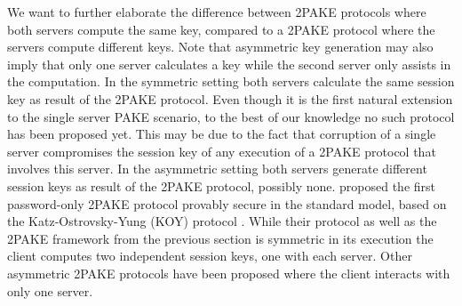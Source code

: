 
We want to further elaborate the difference between \ac{2PAKE} protocols where both servers compute the same key, compared to a \ac{2PAKE} protocol where the servers compute different keys.
Note that asymmetric key generation may also imply that only one server calculates a key while the second server only assists in the computation.
In the symmetric setting both servers calculate the same session key as result of the \ac{2PAKE} protocol.
Even though it is the first natural extension to the single server \ac{PAKE} scenario, to the best of our knowledge no such protocol has been proposed yet.
This may be due to the fact that corruption of a single server compromises the session key of any execution of a \ac{2PAKE} protocol that involves this server.
In the asymmetric setting both servers generate different session keys as result of the \ac{2PAKE} protocol, possibly none.
\citet{Katz2012a} proposed the first password-only \ac{2PAKE} protocol provably secure in the standard model, based on the Katz-Ostrovsky-Yung (KOY) protocol \cite{KatzOY01}.
While their protocol as well as the \ac{2PAKE} framework from the previous section is symmetric in its execution the client computes two independent session keys, one with each server.
Other asymmetric \ac{2PAKE} protocols have been proposed \cite{Yang_Deng_Bao_2006,Jin_Wong_Xu_2007} where the client interacts with only one server.

